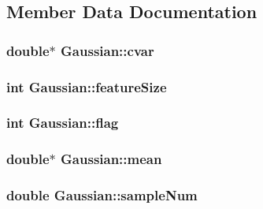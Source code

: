 \subsection{Member Data Documentation}
\hypertarget{class_gaussian_a2a66072c73e3705d524ff5a8380b1695}{
\subsubsection[{cvar}]{\setlength{\rightskip}{0pt plus 5cm}double$\ast$ Gaussian\+::cvar\hspace{0.3cm}{\ttfamily [private]}}}\label{class_gaussian_a2a66072c73e3705d524ff5a8380b1695}
\hypertarget{class_gaussian_a63ce4e0586107dc417039d7c27233e51}{
\subsubsection[{feature\+Size}]{\setlength{\rightskip}{0pt plus 5cm}int Gaussian\+::feature\+Size\hspace{0.3cm}{\ttfamily [private]}}}\label{class_gaussian_a63ce4e0586107dc417039d7c27233e51}
\hypertarget{class_gaussian_a8a05e3e9decc65bc9e5213a87768c941}{
\subsubsection[{flag}]{\setlength{\rightskip}{0pt plus 5cm}int Gaussian\+::flag\hspace{0.3cm}{\ttfamily [private]}}}\label{class_gaussian_a8a05e3e9decc65bc9e5213a87768c941}
\hypertarget{class_gaussian_a600a38f80fb60dc09f19cfabbf8af5f8}{
\subsubsection[{mean}]{\setlength{\rightskip}{0pt plus 5cm}double$\ast$ Gaussian\+::mean\hspace{0.3cm}{\ttfamily [private]}}}\label{class_gaussian_a600a38f80fb60dc09f19cfabbf8af5f8}
\hypertarget{class_gaussian_a61a7510b273ac1cb30229b874304d4db}{
\subsubsection[{sample\+Num}]{\setlength{\rightskip}{0pt plus 5cm}double Gaussian\+::sample\+Num\hspace{0.3cm}{\ttfamily [private]}}}\label{class_gaussian_a61a7510b273ac1cb30229b874304d4db}
